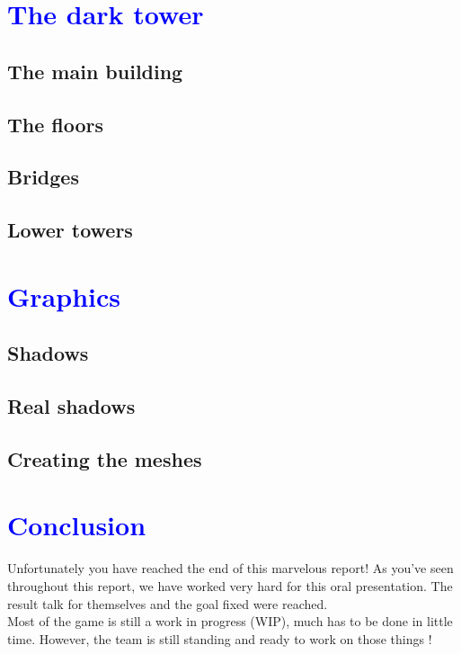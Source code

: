 \documentclass[article]{report}             %
\begin{document}
		\chapter{\textcolor{blue}{The dark tower}}
			\section{The main building}
			\section{The floors}
			\section{Bridges}
			\section{Lower towers}
		\chapter{\textcolor{blue}{Graphics}}
			\section{Shadows}
			\section{Real shadows}
			\section{Creating the meshes}
		
		\chapter{\textcolor{blue}{Conclusion}}
			Unfortunately you have reached the end of this marvelous report! As you've seen throughout this report, we have worked very hard for this oral presentation. The result talk for themselves and the goal fixed were reached.\\
			
			Most of the game is still a work in progress (WIP), much has to be done in little time. However, the team is still standing and ready to work on those things !
			
			
\end{document}

